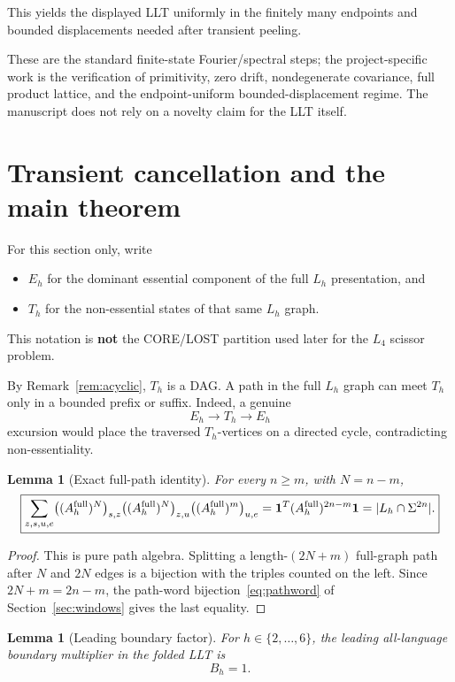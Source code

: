 \documentclass[12pt]{article}
\newtheorem{lemma}[theorem]{Lemma}
\theoremstyle{definition}
\begin{document}
This yields the displayed LLT uniformly in the finitely many endpoints and bounded displacements needed after transient peeling.

These are the standard finite-state Fourier/spectral steps; the project-specific work is the verification of primitivity, zero drift, nondegenerate covariance, full product lattice, and the endpoint-uniform bounded-displacement regime. The manuscript does not rely on a novelty claim for the LLT itself.

\section{Transient cancellation and the main theorem}
\label{sec:cancellation}

For this section only, write
\begin{itemize}
\item \(E_h\) for the dominant essential component of the full \(L_h\) presentation, and
\item \(T_h\) for the non-essential states of that same \(L_h\) graph.
\end{itemize}

This notation is \textbf{not} the CORE/LOST partition used later for the \(L_4\) scissor problem.

By Remark~\ref{rem:acyclic}, \(T_h\) is a DAG. A path in the full \(L_h\) graph can meet \(T_h\) only in a bounded prefix or suffix. Indeed, a genuine
\[
E_h\to T_h\to E_h
\]
excursion would place the traversed \(T_h\)-vertices on a directed cycle, contradicting non-essentiality.

\begin{lemma}[Exact full-path identity]
\label{lem:pathid}
For every \(n\ge m\), with \(N=n-m\),
\[
\boxed{
\sum_{z,s,u,e}
\bigl((A_h^{\rm full})^N\bigr)_{s,z}
\bigl((A_h^{\rm full})^N\bigr)_{z,u}
\bigl((A_h^{\rm full})^m\bigr)_{u,e}
=
\mathbf1^T(A_h^{\rm full})^{2n-m}\mathbf1
=
|L_h\cap\Sigma^{2n}|.
}
\]
\end{lemma}

\begin{proof}
This is pure path algebra. Splitting a length-\((2N+m)\) full-graph path after \(N\) and \(2N\) edges is a bijection with the triples counted on the left. Since \(2N+m=2n-m\), the path-word bijection~\eqref{eq:pathword} of Section~\ref{sec:windows} gives the last equality.
\end{proof}

\begin{lemma}[Leading boundary factor]
\label{lem:boundary}
For \(h\in\{2,\ldots,6\}\), the leading all-language boundary multiplier in the folded LLT is
\[
\boxed{B_h=1.}
\]
\end{lemma}
\end{document}
